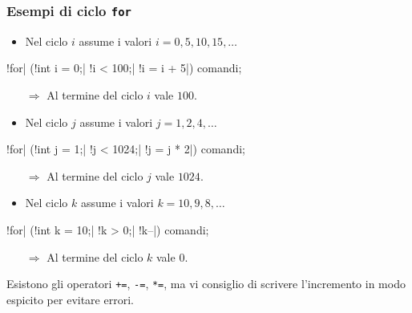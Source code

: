 \begin{frame}[fragile]\frametitle{Esempi di ciclo \texttt{for}}

  \begin{itemize} 
    \item Nel ciclo $i$ assume i valori $i = 0, 5, 10, 15, \dots$
  \end{itemize}
  \begin{JavaCodePlain}[commandchars=\\!|]
    \Word!for| (\Blue!int i = 0;| \Green!i < 100;| \Violet!i = i + 5|) {
      comandi;
    }
  \end{JavaCodePlain}
  \begin{itemize}
    \item[$\Rightarrow$] Al termine del ciclo $i$ vale $100$.
  \end{itemize}

  \begin{itemize} 
    \item Nel ciclo $j$ assume i valori $j = 1, 2, 4, \dots$
  \end{itemize}
  \begin{JavaCodePlain}[commandchars=\\!|]
    \Word!for| (\Blue!int j = 1;| \Green!j < 1024;| \Violet!j = j * 2|) {
      comandi;
    }
  \end{JavaCodePlain}
  \begin{itemize}
   \item[$\Rightarrow$] Al termine del ciclo $j$ vale $1024$.
  \end{itemize}
  
  \begin{itemize} 
    \item Nel ciclo $k$ assume i valori $k = 10, 9, 8, \dots$
  \end{itemize}    
  \begin{JavaCodePlain}[commandchars=\\!|]
    \Word!for| (\Blue!int k = 10;| \Green!k > 0;| \Violet!k--|) {
      comandi;
    }
  \end{JavaCodePlain}
  \begin{itemize}
   \item[$\Rightarrow$] Al termine del ciclo $k$ vale $0$.
  \end{itemize}

  Esistono gli operatori \texttt{+=}, \texttt{-=}, \texttt{*=}, ma vi consiglio di scrivere
  l'incremento in modo espicito per evitare errori.

\end{frame}

